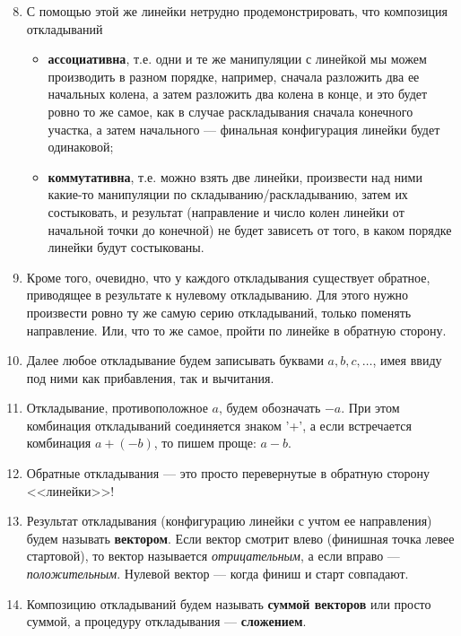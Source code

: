 \begin{enumerate}\setcounter{enumi}{7}
\item С помощью этой же линейки нетрудно продемонстрировать, что композиция откладываний
\begin{itemize}
\item \textbf{ассоциативна}, т.е. одни и те же манипуляции с линейкой мы можем производить в разном порядке, например, сначала разложить два ее начальных колена, а затем разложить два колена в конце, и это будет ровно то же самое, как в случае раскладывания сначала конечного участка, а затем начального --- финальная конфигурация линейки будет одинаковой;
\item \textbf{коммутативна}, т.е. можно взять две линейки, произвести над ними какие-то манипуляции по складыванию/раскладыванию, затем их состыковать, и результат (направление и число колен линейки от начальной точки до конечной) не будет зависеть от того, в каком порядке линейки будут состыкованы.
\end{itemize}
\item Кроме того, очевидно, что у каждого откладывания существует обратное, приводящее в результате к нулевому откладыванию. Для этого нужно произвести ровно ту же самую серию откладываний, только поменять направление. Или, что то же самое, пройти по линейке в обратную сторону.
\item Далее любое откладывание будем записывать буквами $a,b,c,\dots$, имея ввиду под ними как прибавления, так и вычитания.
\item Откладывание, противоположное $a$, будем обозначать $-a$. При этом комбинация откладываний соединяется знаком '+', а если встречается комбинация $a+(-b)$, то пишем проще: $a-b$.
\item Обратные откладывания --- это просто перевернутые в обратную сторону <<линейки>>!
\item Результат откладывания (конфигурацию линейки с учтом ее направления) будем называть \textbf{вектором}. Если вектор смотрит влево (финишная точка левее стартовой), то вектор называется \textit{отрицательным}, а если вправо --- \textit{положительным}. Нулевой вектор --- когда финиш и старт совпадают.
\item Композицию откладываний будем называть \textbf{суммой векторов} или просто суммой, а процедуру откладывания --- \textbf{сложением}.
\end{enumerate}

